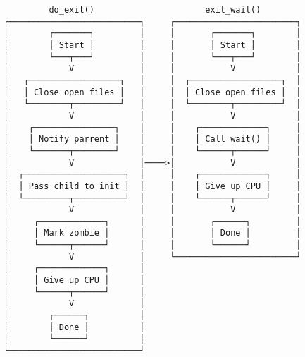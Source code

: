 \documentclass[varwidth=40em,crop]{standalone}
\begin{document}
\begin{verbatim}
         do_exit()                      exit_wait()
┌──────────────────────────┐     ┌────────────────────────┐
│        ┌───────┐         │     │       ┌───────┐        │
│        │ Start │         │     │       │ Start │        │
│        └───┬───┘         │     │       └───┬───┘        │
│            V             │     │           V            │
│   ┌──────────────────┐   │     │  ┌──────────────────┐  │
│   │ Close open files │   │     │  │ Close open files │  │
│   └────────┬─────────┘   │     │  └────────┬─────────┘  │
│            V             │     │           V            │
│    ┌────────────────┐    │     │    ┌─────────────┐     │
│    │ Notify parrent │    │     │    │ Call wait() │     │
│    └───────┬────────┘    │     │    └──────┬──────┘     │
│            V             │────>│           V            │
│  ┌────────────────────┐  │     │    ┌─────────────┐     │
│  │ Pass child to init │  │     │    │ Give up CPU │     │
│  └─────────┬──────────┘  │     │    └──────┬──────┘     │
│            V             │     │           V            │
│     ┌─────────────┐      │     │       ┌──────┐         │
│     │ Mark zombie │      │     │       │ Done │         │
│     └──────┬──────┘      │     │       └──────┘         │
│            V             │     └────────────────────────┘
│     ┌─────────────┐      │
│     │ Give up CPU │      │
│     └──────┬──────┘      │
│            V             │
│        ┌──────┐          │
│        │ Done │          │
│        └──────┘          │
└──────────────────────────┘
\end{verbatim}
\end{document}
